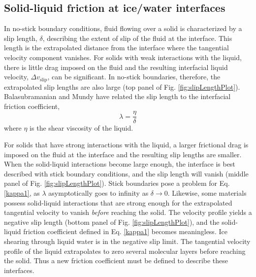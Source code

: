 \subsection{Solid-liquid friction at ice/water interfaces}
In no-stick boundary conditions, fluid flowing over a solid is
characterized by a slip length, $\delta$, describing the extent of
slip of the fluid at the interface. This length is the extrapolated
distance from the interface where the tangential velocity component
vanishes. For solids with weak interactions with the liquid, there is
little drag imposed on the fluid and the resulting interfacial liquid
velocity, $\Delta v_\mathrm{slip}$, can be significant. In no-stick
boundaries, therefore, the extrapolated slip lengths are also large
(top panel of Fig. \ref{fig:slipLengthPlot}).  Balasubramanian and
Mundy have related the slip length to the interfacial friction
coefficient, 
\begin{equation}\label{kappa1}
\lambda = \frac{\eta}{\delta}
\end{equation}
where $\eta$ is the shear viscosity of the
liquid.\cite{Balasubramanian1999}

For solids that have strong interactions with the liquid, a larger
frictional drag is imposed on the fluid at the interface and the
resulting slip lengths are smaller. When the solid-liquid interactions
become large enough, the interface is best described with stick
boundary conditions, and the slip length will vanish (middle panel of
Fig. \ref{fig:slipLengthPlot}).  Stick boundaries pose a problem for
Eq.  \eqref{kappa1}, as $\lambda$ asymptotically goes to infinity as
$\delta \rightarrow 0$.  Likewise, some materials possess solid-liquid
interactions that are strong enough for the extrapolated tangential
velocity to vanish \textit{before} reaching the solid. The velocity
profile yields a negative slip length (bottom panel of Fig.
\ref{fig:slipLengthPlot}), and the solid-liquid friction coefficient
defined in Eq. \eqref{kappa1} becomes meaningless.  Ice shearing
through liquid water is in the negative slip limit. The tangential
velocity profile of the liquid extrapolates to zero several molecular
layers before reaching the solid. Thus a new friction coefficient must
be defined to describe these interfaces.

